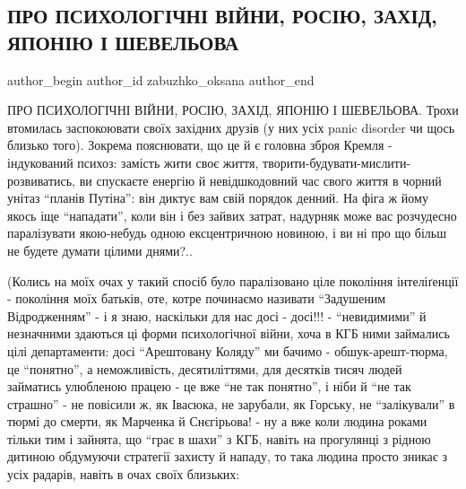  
 
 
 
 
 
\subsection{ПРО ПСИХОЛОГІЧНІ ВІЙНИ, РОСІЮ, ЗАХІД, ЯПОНІЮ І ШЕВЕЛЬОВА}
\label{sec:19_01_2022.fb.zabuzhko_oksana.1.rossia_psihovojny_sheveljov}
 
\ifcmt
 author_begin
   author_id zabuzhko_oksana
 author_end
\fi

ПРО ПСИХОЛОГІЧНІ ВІЙНИ, РОСІЮ, ЗАХІД, ЯПОНІЮ І ШЕВЕЛЬОВА. Трохи втомилась
заспокоювати своїх західних друзів (у них усіх panic disorder чи щось близько
того). Зокрема пояснювати, що це й є головна зброя Кремля - індукований психоз:
замість жити своє життя, творити-будувати-мислити-розвиватись, ви спускаєте
енергію й невідшкодовний час свого життя в чорний унітаз \enquote{планів Путіна}: він
диктує вам свій порядок денний. На фіга ж йому якось іще \enquote{нападати}, коли він і
без зайвих затрат, надурняк може вас розчудесно паралізувати якою-небудь одною
ексцентричною новиною, і ви ні про що більш не будете думати цілими днями?..

(Колись на моїх очах у такий спосіб було паралізовано ціле покоління
інтеліґенції - покоління моїх батьків, оте, котре починаємо називати \enquote{Задушеним
Відродженням} - і я знаю, наскільки для нас досі - досі!!! - \enquote{невидимими} й
незначними здаються ці форми психологічної війни, хоча в КГБ ними займались
цілі департаменти: досі \enquote{Арештовану Коляду} ми бачимо - обшук-арешт-тюрма, це
\enquote{понятно}, а неможливість, десятиліттями, для десятків тисяч людей займатись
улюбленою працею - це вже \enquote{не так понятно}, і ніби й \enquote{не так страшно} - не
повісили ж, як Івасюка, не зарубали, як Горську, не \enquote{залікували} в тюрмі до
смерти, як Марченка й Снєгірьова! - ну а вже коли людина роками тільки тим і
зайнята, що \enquote{грає в шахи} з КГБ, навіть на прогулянці з рідною дитиною
обдумуючи стратегії захисту й нападу, то така людина просто зникає з усіх
радарів, навіть в очах своїх близьких:

